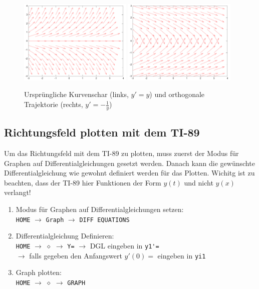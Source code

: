 \begin{figure}[h!]
	\centering
	\includegraphics[width=0.48\textwidth]{../fig/trajektorien1.pdf}
	\includegraphics[width=0.48\textwidth]{../fig/trajektorien2.pdf}
	\caption{Ursprüngliche Kurvenschar (links, $y'=y$) 
	und orthogonale Trajektorie (rechts, $y'=-\frac{1}{y}$)}
\end{figure}

\newpage

\ifti
\subsection{Richtungsfeld plotten mit dem TI-89}
Um das Richtungsfeld mit dem TI-89 zu plotten, muss zuerst der Modus 
für Graphen auf Differentialgleichungen gesetzt werden. Danach kann die
gewünschte Differentialgleichung wie gewohnt definiert werden für das
Plotten. Wichitg ist zu beachten, dass der TI-89 hier Funktionen der Form 
$y(t)$ und nicht $y(x)$ verlangt!

\begin{enumerate}
	\item Modus für Graphen auf Differentialgleichungen setzen: \\
		\verb?HOME? 
		$\rightarrow$ \verb?Graph? 
		$\rightarrow$ \verb?DIFF EQUATIONS?
	\item Differentialgleichung Definieren: \\
		\verb?HOME?
		$\rightarrow$ $\diamond$
		$\rightarrow$ \verb?Y=?
		$\rightarrow$ DGL eingeben in \verb?y1'=? \\
		$\rightarrow$ falls gegeben den Anfangswert 
			$y'(0)=$ eingeben in \verb?yi1? 
	\item Graph plotten: \\
		\verb?HOME?
		$\rightarrow$ $\diamond$
		$\rightarrow$ \verb?GRAPH?
\end{enumerate}

